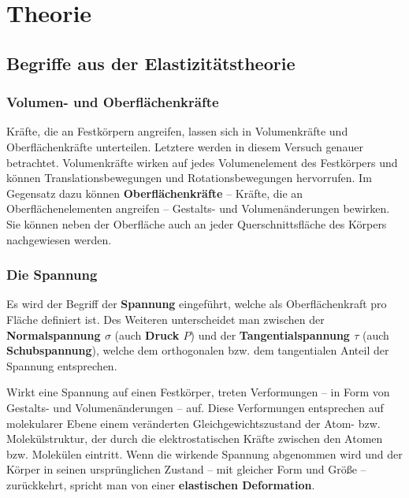 \section{Theorie}
\label{sec:Theorie}

\subsection{Begriffe aus der Elastizitätstheorie}
\label{sec:begriffe}

\subsubsection{Volumen- und Oberflächenkräfte}
Kräfte, die an Festkörpern angreifen, lassen sich in Volumenkräfte und Oberflächenkräfte
unterteilen. Letztere werden in diesem Versuch genauer betrachtet.
Volumenkräfte wirken auf jedes Volumenelement des Festkörpers und können Translationsbewegungen
und Rotationsbewegungen hervorrufen.
Im Gegensatz dazu können \textbf{Oberflächenkräfte} -- Kräfte, die an Oberflächenelementen
angreifen -- Gestalts- und Volumenänderungen bewirken. Sie können neben der Oberfläche auch an
jeder Querschnittsfläche des Körpers nachgewiesen werden.

\subsubsection{Die Spannung}
Es wird der Begriff der \textbf{Spannung} eingeführt, welche als Oberflächenkraft pro Fläche
definiert ist. Des Weiteren unterscheidet man zwischen der \textbf{Normalspannung $\sigma$}
(auch \textbf{Druck $P$}) und der \textbf{Tangentialspannung $\tau$} (auch
\textbf{Schubspannung}), welche dem orthogonalen bzw. dem tangentialen Anteil der Spannung
entsprechen.

Wirkt eine Spannung auf einen Festkörper, treten Verformungen -- in Form von Gestalts- und
Volumenänderungen -- auf. Diese Verformungen entsprechen auf molekularer Ebene einem veränderten
Gleichgewichtszustand der Atom- bzw. Molekülstruktur, der durch die elektrostatischen
Kräfte zwischen den Atomen bzw. Molekülen eintritt. Wenn die wirkende Spannung abgenommen wird
und der Körper in seinen ursprünglichen Zustand -- mit gleicher Form und Größe -- zurückkehrt,
spricht man von einer \textbf{elastischen Deformation}.

